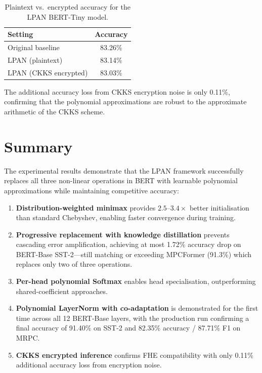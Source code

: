 \begin{table}[ht]
\centering
\caption{Plaintext vs.\ encrypted accuracy for the LPAN BERT-Tiny model.}
\label{tab:encrypted_accuracy}
\begin{tabular}{lc}
\toprule
\textbf{Setting} & \textbf{Accuracy} \\
\midrule
Original baseline    & 83.26\% \\
LPAN (plaintext)     & 83.14\% \\
LPAN (CKKS encrypted) & 83.03\% \\
\bottomrule
\end{tabular}
\end{table}

The additional accuracy loss from CKKS encryption noise is only 0.11\%, confirming that the polynomial approximations are robust to the approximate arithmetic of the CKKS scheme.


\section{Summary}
\label{sec:results_summary}

The experimental results demonstrate that the LPAN framework successfully replaces all three non-linear operations in BERT with learnable polynomial approximations while maintaining competitive accuracy:

\begin{enumerate}
    \item \textbf{Distribution-weighted minimax} provides $2.5$--$3.4\times$ better initialisation than standard Chebyshev, enabling faster convergence during training.
    \item \textbf{Progressive replacement with knowledge distillation} prevents cascading error amplification, achieving at most 1.72\% accuracy drop on BERT-Base SST-2---still matching or exceeding MPCFormer (91.3\%) which replaces only two of three operations.
    \item \textbf{Per-head polynomial Softmax} enables head specialisation, outperforming shared-coefficient approaches.
    \item \textbf{Polynomial LayerNorm with co-adaptation} is demonstrated for the first time across all 12 BERT-Base layers, with the production run confirming a final accuracy of 91.40\% on SST-2 and 82.35\% accuracy / 87.71\% F1 on MRPC.
    \item \textbf{CKKS encrypted inference} confirms FHE compatibility with only 0.11\% additional accuracy loss from encryption noise.
\end{enumerate}

